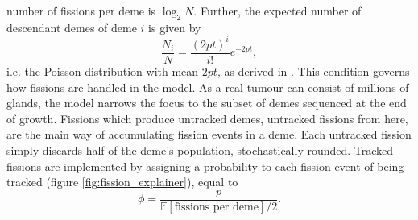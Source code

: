  number of fissions per deme is $\log_2N$. Further, the expected number of
 descendant demes of deme $i$ is given by
\begin{equation}
    \frac{N_i}{N} = \frac{(2pt)^i}{i!}e^{-2pt},
\end{equation}
i.e. the Poisson distribution with mean $2pt$, as derived in
\cite{kharlamov_generation_1969}. This condition governs how fissions are
handled in the model. As a real tumour can consist of millions of glands, the
model narrows the focus to the subset of demes sequenced at the end of growth.
Fissions which produce untracked demes, untracked fissions from here, are the
main way of accumulating fission events in a deme. Each untracked fission
simply discards half of the deme's population, stochastically rounded. Tracked
fissions are implemented by assigning a probability to each fission event of
being tracked (figure \ref{fig:fission_explainer}), equal to
\begin{equation}
    \phi = \frac{p}{\mathbb{E}[\text{fissions per deme}]/2}.
\end{equation}

